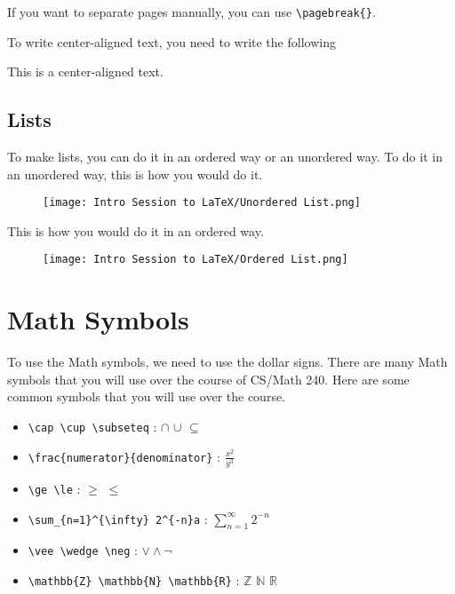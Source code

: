 \documentclass[11pt]{article}
\begin{document}
If you want to separate pages manually, you can use \verb|\pagebreak{}|.

To write center-aligned text, you need to write the following

\begin{center}
This is a center-aligned text.
\end{center}

\subsection{Lists}
To make lists, you can do it in an ordered way or an unordered way. To do it in an unordered way, this is how you would do it. 

\vspace{3mm}
\begin{figure}[htbp]
\centerline{\texttt{[image: Intro Session to LaTeX/Unordered List.png]}}
\end{figure}
\vspace{3mm}

This is how you would do it in an ordered way.

\vspace{3mm}
\begin{figure}[htbp]
\centerline{\texttt{[image: Intro Session to LaTeX/Ordered List.png]}}
\end{figure}
\vspace{3mm}

\section{Math Symbols}
To use the Math symbols, we need to use the dollar signs. There are many Math symbols that you will use over the course of CS/Math 240. Here are some common symbols that you will use over the course.

\begin{itemize}
    \item \verb|\cap \cup \subseteq| : $\cap$ $\cup$ $\subseteq$
    \item \verb|\frac{numerator}{denominator}| : $\frac{x^2}{y^3}$
    \item \verb|\ge \le| : $\ge$ $\le$
    \item \verb|\sum_{n=1}^{\infty} 2^{-n}a| : $\sum_{n=1}^{\infty} 2^{-n}$ 
    \item \verb|\vee \wedge \neg| : $\vee \wedge \neg$
    \item \verb|\mathbb{Z} \mathbb{N} \mathbb{R}| : $\mathbb{Z}$ $\mathbb{N}$ $\mathbb{R}$
\end{itemize}
\end{document}
